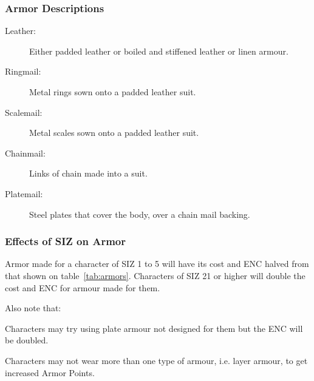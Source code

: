 \subsubsection{Armor Descriptions}
\begin{description}
	\item[Leather:] Either padded leather or boiled and stiffened leather or linen armour.
	\item[Ringmail:] Metal rings sown onto a padded leather suit.
	\item[Scalemail:] Metal scales sown onto a padded leather suit.
	\item[Chainmail:] Links of chain made into a suit.
	\item[Platemail:] Steel plates that cover the body, over a chain mail backing.
\end{description}

\subsubsection{Effects of SIZ on Armor}
Armor made for a character of SIZ 1 to 5 will have its cost and ENC halved from that shown on table~\ref{tab:armors}. Characters of SIZ 21 or higher will double the cost and ENC for armour made for them.

Also note that:
\begin{rpg-list}
	\item Characters may try using plate armour not designed for them but the ENC will be doubled. 
	\item Characters may not wear more than one type of armour, i.e. layer armour, to get increased Armor Points. 
\end{rpg-list}


